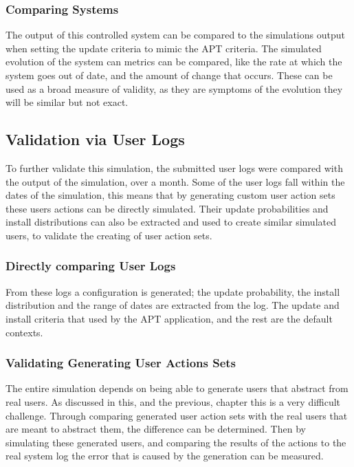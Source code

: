 
\subsubsection{Comparing Systems}
The output of this controlled system can be compared to the simulations output when setting the update criteria to mimic the APT criteria.
The simulated evolution of the system can metrics can be compared, like the rate at which the system goes out of date, and the amount of change that occurs.
These can be used as a broad measure of validity, as they are symptoms of the evolution they will be similar but not exact.


\subsection{Validation via User Logs}
To further validate this simulation, the submitted user logs were compared with the output of the simulation, over a month.
Some of the user logs fall within the dates of the simulation, this means that by generating custom user action sets these users actions can be directly simulated.
Their update probabilities and install distributions can also be extracted and used to create similar simulated users, to validate the creating of user action sets.

\subsubsection{Directly comparing User Logs}
From these logs a configuration is generated; the update probability, the install distribution and the range of dates are extracted from the log.
The update and install criteria that used by the APT application, and the rest are the default contexts.  


\subsubsection{Validating Generating User Actions Sets}
The entire simulation depends on being able to generate users that abstract from real users.
As discussed in this, and the previous, chapter this is a very difficult challenge.
Through comparing generated user action sets with the real users that are meant to abstract them, the difference can be determined.
Then by simulating these generated users, and comparing the results of the actions to the real system log the error that is caused by the generation can be measured.  

